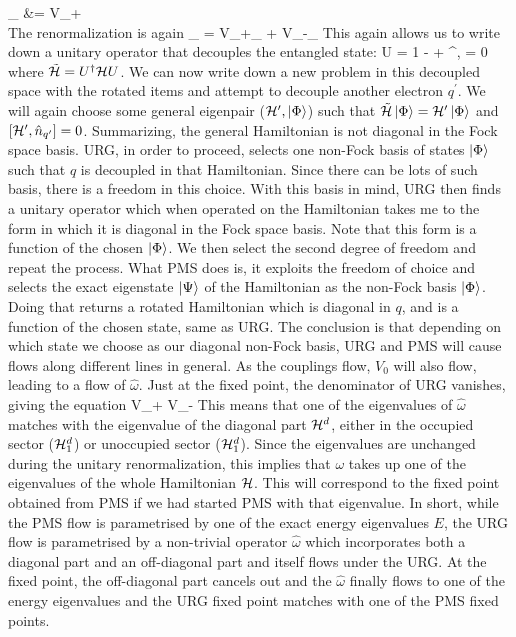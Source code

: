 \documentclass[14pt]{extarticle}
\numberwithin{equation}{section}
\begin{document}
\beq
\rr{\eta^\dagger}_ &= V_+\\
\eeq
The renormalization is again
\beq
\rr{\Delta \ham}_ = V_+\rr{\eta}_ + V_-\rr{\eta^\dagger}_
\eeq
This again allows us to write down a unitary operator that decouples the entangled state:
\beq
U =  1 - \eta + \eta^\dagger,  = 0
\eeq
where \(\tilde {\mathcal{H}} = U^\dagger \mathcal{H} U\). We can now write down a new problem in this decoupled space with the rotated items and attempt to decouple another electron \(q^\prime\). We will again choose some general eigenpair (\(\mathcal{H}^\prime,\ket{\Phi}\)) such that \(\tilde{\mathcal{H}}\ket{\Phi} = \mathcal{H}^{\prime}\ket{\Phi}\) and \(\left[{\mathcal{H}^{\prime},\hat n_{q^\prime}}\right]=0\).
\pb Summarizing, the general Hamiltonian is not diagonal in the Fock space basis.
URG, in order to proceed, selects one non-Fock basis of states \(\ket{\Phi}\) such that \(q\) is decoupled in that Hamiltonian.
Since there can be lots of such basis, there is a freedom in this choice.
With this basis in mind, URG then finds a unitary operator which when operated on the Hamiltonian takes me to the form in which it is diagonal in the Fock space basis.
Note that this form is a function of the chosen \(\ket{\Phi}\).
We then select the second degree of freedom and repeat the process.
What PMS does is, it exploits the freedom of choice and selects the exact eigenstate \(\ket{\Psi}\) of the Hamiltonian as the non-Fock basis \(\ket{\Phi}\).
Doing that returns a rotated Hamiltonian which is diagonal in \(q\), and is a function of the chosen state, same as URG. The conclusion is that depending on which state we choose as our diagonal non-Fock basis, URG and PMS will cause flows along different lines in general.
\pb As the couplings flow, \(V_0\) will also flow, leading to a flow of \(\hat\omega\). Just at the fixed point, the denominator of URG vanishes, giving the equation
\beq
{}V_+  V_-
\eeq
This means that one of the eigenvalues of \(\hat\omega\) matches with the eigenvalue of the diagonal part \(\mathcal{H}^d\), either in the occupied sector (\(\mathcal{H}^d_1\)) or unoccupied sector (\(\mathcal{H}^d_1\)). Since the eigenvalues are unchanged during the unitary renormalization, this implies that \(\omega\) takes up one of the eigenvalues of the whole Hamiltonian \(\mathcal{H}\). This will correspond to the fixed point obtained from PMS if we had started PMS with that eigenvalue.
\pb In short, while the PMS flow is parametrised by one of the exact energy eigenvalues \(E\), the URG flow is parametrised by a non-trivial operator \(\hat \omega\) which incorporates both a diagonal part and an off-diagonal part and itself flows under the URG. At the fixed point, the off-diagonal part cancels out and the \(\hat\omega\) finally flows to one of the energy eigenvalues and the URG fixed point matches with one of the PMS fixed points.
\end{document}
